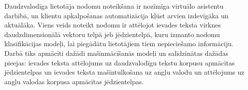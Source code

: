Daudzvalodīga lietotāja nodomu noteikšana ir nozīmīga virtuālo asistentu darbībā, un klientu apkalpošanas automatizācija kļūst arvien izdevīgāka un aktuālāka. Viens veids noteikt nodomu ir attēlojot ievades teksta virknes daudzdimensionālā vektoru telpā jeb jēdzientelpā, kuru izmanto nodomu klasifikācijas modeļi, lai piegādātu lietotājiem tiem nepieciešamo informāciju. Darbā tiks apmācīti dažādi mašīnmācīšanās modeļi un salīdzinātas dažādas pieejas: ievades teksta attēlojums uz daudzvalodīgu tekstu korpusu apmācītas jēdzientelpas un ievades teksta mašīntulkošana uz angļu valodu un attēlojums uz angļu valodas korpusa apmācītas jēdzientelpas.

